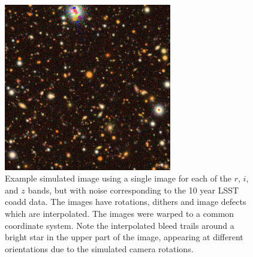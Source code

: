 \documentclass[twocolumn,twocolappendix,astrosym]{openjournal}
\begin{document}
\begin{figure}
    \begin{center}
    \includegraphics[width=0.65\textwidth]{example-image.jpg}
    \caption{
        Example simulated image using a single image for each of the $r$, $i$,
        and $z$ bands, but with noise corresponding to the 10 year LSST coadd data.
        The images have rotations, dithers and image defects which are interpolated.
        The images were warped to a common coordinate system.
        Note the interpolated bleed trails around a bright star in the upper
        part of the image, appearing at different orientations due to the
        simulated camera rotations.
    } \label{fig:colorimage}
    \end{center}
\end{figure}
\end{document}
